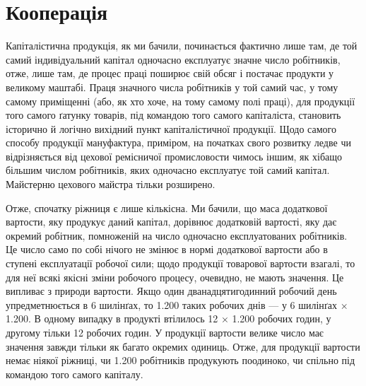\section{Кооперація}
Капіталістична продукція, як ми бачили, починається фактично
лише там, де той самий індивідуальний капітал одночасно експлуатує
значне число робітників, отже, лише там, де процес праці
поширює свій обсяг і постачає продукти у великому маштабі.
Праця значного числа робітників у той самий час, у тому самому
приміщенні (або, як хто хоче, на тому самому полі праці), для продукції
того самого ґатунку товарів, під командою того самого
капіталіста, становить історично й логічно вихідний пункт капіталістичної
продукції. Щодо самого способу продукції мануфактура,
приміром, на початках свого розвитку ледве чи відрізняється
від цехової ремісничої промисловости чимось іншим, як
хібащо більшим числом робітників, яких одночасно експлуатує
той самий капітал. Майстерню цехового майстра тільки розширено.

Отже, спочатку ріжниця є лише кількісна. Ми бачили, що
маса додаткової вартости, яку продукує даний капітал, дорівнює
додатковій вартості, яку дає окремий робітник, помноженій на
число одночасно експлуатованих робітників. Це число само по
собі нічого не змінює в нормі додаткової вартости або в ступені
експлуатації робочої сили; щодо продукції товарової вартости
взагалі, то для неї всякі якісні зміни робочого процесу, очевидно,
не мають значення. Це випливає з природи вартости. Якщо один
дванадцятигодинний робочий день упредметнюється в 6 шилінґах,
то 1.200 таких робочих днів — у 6 шилінґах × 1.200. В одному
випадку в продукті втілилось 12 × 1.200 робочих годин, у другому
тільки 12 робочих годин. У продукції вартости велике число
має значення завжди тільки як багато окремих одиниць. Отже, для
продукції вартости немає ніякої ріжниці, чи 1.200 робітників продукують
поодиноко, чи спільно під командою того самого капіталу.

